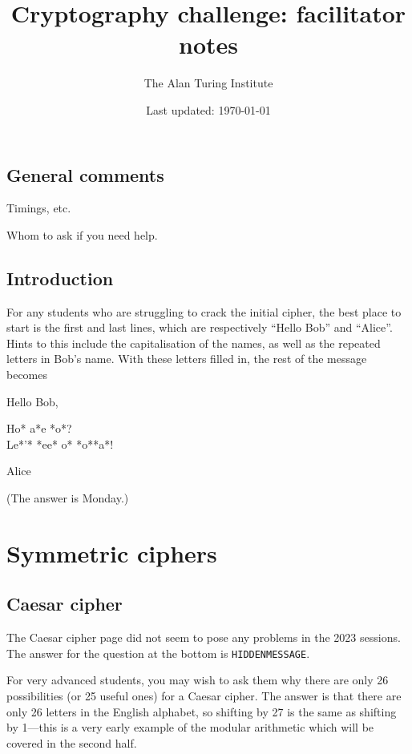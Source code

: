 \documentclass[12pt]{article}
\begin{document}
\title{Cryptography challenge: facilitator notes}
\author{The Alan Turing Institute}
\date{Last updated: \today}
\maketitle

\subsection*{General comments}

Timings, etc.

Whom to ask if you need help.

\subsection{Introduction}

For any students who are struggling to crack the initial cipher, the best place to start is the first and last lines, which are respectively ``Hello Bob'' and ``Alice''.
Hints to this include the capitalisation of the names, as well as the repeated letters in Bob's name.
With these letters filled in, the rest of the message becomes

\begin{displayquote}
Hello Bob,

Ho* a*e *o*?\\
Le*'* *ee* o* *o**a*!

Alice
\end{displayquote}

(The answer is Monday.)

\pagebreak
\section*{Symmetric ciphers}

\subsection{Caesar cipher}

The Caesar cipher page did not seem to pose any problems in the 2023 sessions.
The answer for the question at the bottom is \texttt{HIDDENMESSAGE}.

For very advanced students, you may wish to ask them why there are only 26 possibilities (or 25 useful ones) for a Caesar cipher.
The answer is that there are only 26 letters in the English alphabet, so shifting by 27 is the same as shifting by 1---this is a very early example of the modular arithmetic which will be covered in the second half.
\end{document}
